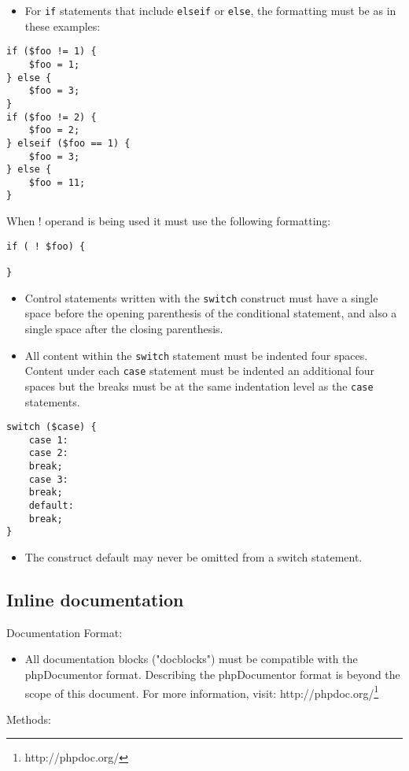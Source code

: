 \documentclass[11pt,a4paper]{report}
\begin{document}
\begin{itemize}
\item{For \texttt{if} statements that include \texttt{elseif} or \texttt{else}, the formatting must be as in these examples:}
\end{itemize}
\begin{verbatim}
if ($foo != 1) {
    $foo = 1;
} else {
    $foo = 3;
}
if ($foo != 2) {
    $foo = 2;
} elseif ($foo == 1) {
    $foo = 3;
} else {
    $foo = 11;
}
\end{verbatim}

When ! operand is being used it must use the following formatting:

\begin{verbatim}
if ( ! $foo) {

}
\end{verbatim}

\begin{itemize}
\item{Control statements written with the \texttt{switch} construct must have a single space before the opening parenthesis of the conditional statement, and also a single space after the closing parenthesis.}
\item{All content within the \texttt{switch} statement must be indented four spaces. Content under each \texttt{case} statement must be indented an additional four spaces but the breaks must be at the same indentation level as the \texttt{case} statements.}
\end{itemize}
\begin{verbatim}
switch ($case) {
    case 1:
    case 2:
    break;
    case 3:
    break;
    default:
    break;
}
\end{verbatim}

\begin{itemize}
\item{The construct default may never be omitted from a switch statement.}
\end{itemize}
\subsection{Inline documentation}
Documentation Format:

\begin{itemize}
\item{All documentation blocks ("docblocks") must be compatible with the phpDocumentor format. Describing the phpDocumentor format is beyond the scope of this document. For more information, visit: http://phpdoc.org/\footnote{http://phpdoc.org/}}
\end{itemize}
Methods:
\end{document}
